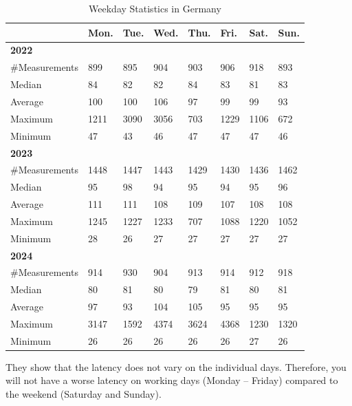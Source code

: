 \begin{table}
	\begin{tabular}{llllllll}
		\toprule
		               & Mon. & Tue. & Wed. & Thu. & Fri. & Sat. & Sun. \\
		\midrule
		\textbf{2022}  &      &      &      &      &      &      &      \\
		\#Measurements & 899  & 895  & 904  & 903  & 906  & 918  & 893  \\
		Median         & 84   & 82   & 82   & 84   & 83   & 81   & 83   \\
		Average        & 100  & 100  & 106  & 97   & 99   & 99   & 93   \\
		Maximum        & 1211 & 3090 & 3056 & 703  & 1229 & 1106 & 672  \\
		Minimum        & 47   & 43   & 46   & 47   & 47   & 47   & 46   \\
		\midrule
		\textbf{2023}  &      &      &      &      &      &      &      \\
		\#Measurements & 1448 & 1447 & 1443 & 1429 & 1430 & 1436 & 1462 \\
		Median         & 95   & 98   & 94   & 95   & 94   & 95   & 96   \\
		Average        & 111  & 111  & 108  & 109  & 107  & 108  & 108  \\
		Maximum        & 1245 & 1227 & 1233 & 707  & 1088 & 1220 & 1052 \\
		Minimum        & 28   & 26   & 27   & 27   & 27   & 27   & 27   \\
		\midrule
		\textbf{2024}  &      &      &      &      &      &      &      \\
		\#Measurements & 914  & 930  & 904  & 913  & 914  & 912  & 918  \\
		Median         & 80   & 81   & 80   & 79   & 81   & 80   & 81   \\
		Average        & 97   & 93   & 104  & 105  & 95   & 95   & 95   \\
		Maximum        & 3147 & 1592 & 4374 & 3624 & 4368 & 1230 & 1320 \\
		Minimum        & 26   & 26   & 26   & 26   & 26   & 27   & 26   \\
		\bottomrule
	\end{tabular}
	\caption{Weekday Statistics in Germany}
	\label{fig:weekday-statistics}
\end{table}

They show that the latency does not vary on the individual days. Therefore, you
will not have a worse latency on working days (Monday -- Friday) compared to
the weekend (Saturday and Sunday).

